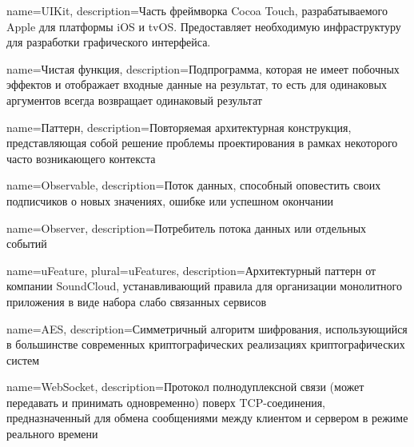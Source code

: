 




{
  name={UIKit},
  description={Часть фреймворка Cocoa Touch, разрабатываемого Apple для платформы iOS и tvOS. Предоставляет необходимую инфраструктуру для разработки графического интерфейса.}
}

{
  name={Чистая функция},
  description={Подпрограмма, которая не имеет побочных эффектов и отображает входные данные на результат, то есть для одинаковых аргументов всегда возвращает одинаковый результат}
}

{
  name={Паттерн},
  description={Повторяемая архитектурная конструкция, представляющая собой решение проблемы проектирования в рамках некоторого часто возникающего контекста}
}

{
  name=Observable,
  description={Поток данных, способный оповестить своих подписчиков о новых значениях, ошибке или успешном окончании}
}

{
  name=Observer,
  description={Потребитель потока данных или отдельных событий}
}

{
  name=uFeature,
  plural={uFeatures},
  description={Архитектурный паттерн от компании SoundCloud, устанавливающий правила для организации монолитного приложения в виде набора слабо связанных сервисов}
}

{
  name=AES,
  description={Симметричный алгоритм шифрования, использующийся в большинстве современных криптографических реализациях криптографических систем}
}

{
  name=WebSocket,
  description={Протокол полнодуплексной связи (может передавать и принимать одновременно) поверх TCP-соединения, предназначенный для обмена сообщениями между клиентом и сервером в режиме реального времени}
}


\glsaddall


